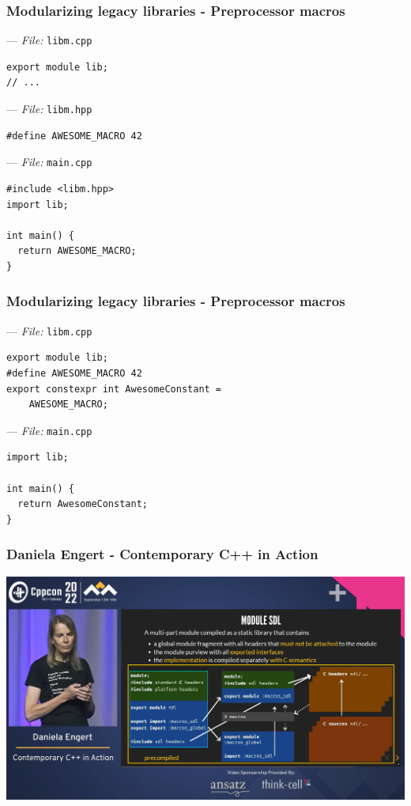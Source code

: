 \documentclass[aspectratio=169]{beamer}
\begin{document}
\begin{frame}[fragile]
  \frametitle{Modularizing legacy libraries - Preprocessor macros}

  --- \textit{File:} \texttt{libm.cpp}
  \begin{lstlisting}[style=cpp20]
export module lib;
// ...
  \end{lstlisting}

  --- \textit{File:} \texttt{libm.hpp}
    \begin{lstlisting}[style=cpp20]
#define AWESOME_MACRO 42
  \end{lstlisting}

  --- \textit{File:} \texttt{main.cpp}
  \begin{lstlisting}[style=cpp20]
#include <libm.hpp>
import lib;

int main() {
  return AWESOME_MACRO;
}
  \end{lstlisting}

\end{frame}


\begin{frame}[fragile]
  \frametitle{Modularizing legacy libraries - Preprocessor macros}

  --- \textit{File:} \texttt{libm.cpp}
  \begin{lstlisting}[style=cpp20]
export module lib;
#define AWESOME_MACRO 42
export constexpr int AwesomeConstant =
    AWESOME_MACRO;
  \end{lstlisting}

  --- \textit{File:} \texttt{main.cpp}
  \begin{lstlisting}[style=cpp20]
import lib;

int main() {
  return AwesomeConstant;
}
  \end{lstlisting}

\end{frame}

\begin{frame}
  \frametitle{Daniela Engert - Contemporary C++ in Action}
  \begin{center}
    \href{https://www.youtube.com/watch?v=yUIFdL3D0Vk}
    {\includegraphics[height=.8\textheight]{modulesgfx/engert_contemporary.jpg}}
  \end{center}
\end{frame}
\end{document}

